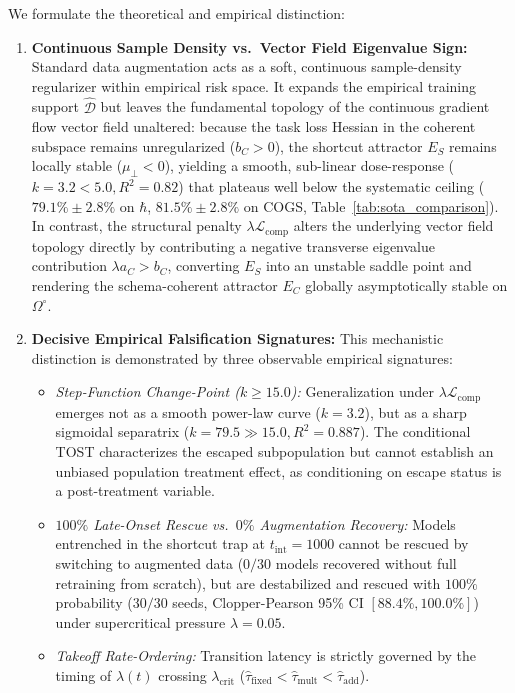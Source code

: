 \documentclass{article}
\theoremstyle{plain}
\theoremstyle{definition}
\begin{document}
We formulate the theoretical and empirical distinction:
\begin{enumerate}[leftmargin=*,noitemsep]
    \item \textbf{Continuous Sample Density vs.\ Vector Field Eigenvalue Sign:} Standard data augmentation acts as a soft, continuous sample-density regularizer within empirical risk space. It expands the empirical training support $\hat{\mathcal{D}}$ but leaves the fundamental topology of the continuous gradient flow vector field unaltered: because the task loss Hessian in the coherent subspace remains unregularized ($b_C > 0$), the shortcut attractor $E_S$ remains locally stable ($\mu_{\perp} < 0$), yielding a smooth, sub-linear dose-response ($k = 3.2 < 5.0, R^2 = 0.82$) that plateaus well below the systematic ceiling ($79.1\% \pm 2.8\%$ on $\hbar$, $81.5\% \pm 2.8\%$ on COGS, Table~\ref{tab:sota_comparison}). In contrast, the structural penalty $\lambda \mathcal{L}_{\text{comp}}$ alters the underlying vector field topology directly by contributing a negative transverse eigenvalue contribution $\lambda a_C > b_C$, converting $E_S$ into an unstable saddle point and rendering the schema-coherent attractor $E_C$ globally asymptotically stable on $\Omega^\circ$.
    \item \textbf{Decisive Empirical Falsification Signatures:} This mechanistic distinction is demonstrated by three observable empirical signatures:
    \begin{itemize}[noitemsep]
        \item \emph{Step-Function Change-Point ($k \ge 15.0$):} Generalization under $\lambda \mathcal{L}_{\text{comp}}$ emerges not as a smooth power-law curve ($k = 3.2$), but as a sharp sigmoidal separatrix ($k = 79.5 \gg 15.0, R^2 = 0.887$). The conditional TOST characterizes the escaped subpopulation but cannot establish an unbiased population treatment effect, as conditioning on escape status is a post-treatment variable.
        \item \emph{$100\%$ Late-Onset Rescue vs.\ $0\%$ Augmentation Recovery:} Models entrenched in the shortcut trap at $t_{\text{int}} = 1000$ cannot be rescued by switching to augmented data ($0/30$ models recovered without full retraining from scratch), but are destabilized and rescued with $100\%$ probability ($30/30$ seeds, Clopper-Pearson 95\% CI $[88.4\%, 100.0\%]$) under supercritical pressure $\lambda = 0.05$.
        \item \emph{Takeoff Rate-Ordering:} Transition latency is strictly governed by the timing of $\lambda(t)$ crossing $\lambda_{\text{crit}}$ ($\hat{\tau}_{\text{fixed}} < \hat{\tau}_{\text{mult}} < \hat{\tau}_{\text{add}}$).

\end{itemize}
\end{enumerate}
\end{document}
